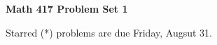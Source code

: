 \documentclass[12pt]{article}
\begin{document}
\def\ctln{\centerline}
\def\msk{\medskip}
\def\bsk{\bigskip}
\def\ssk{\smallskip}
\def\hsk{\hskip.3in}
\def\ra{\rightarrow}
\def\ubr{\underbar}

\def\mt{{\mathcal T}}
\def\mb{{\mathcal B}}
\def\ms{{\mathcal S}}
\def\mu{{\mathcal U}}
\def\mv{{\mathcal V}}

\def\bbr{{\mathbb R}}
\def\bbz{{\mathbb Z}}
\def\spc{$~$\hskip.15in$~$}

\def\sset{\subseteq}
\def\del{\partial}
\def\lra{$\Leftrightarrow$}
\def\bra{$\Rightarrow$}




\ctln{\bf Math 417 Problem Set 1}

\msk

Starred (*) problems are due Friday, Augsut 31.
\end{document}
